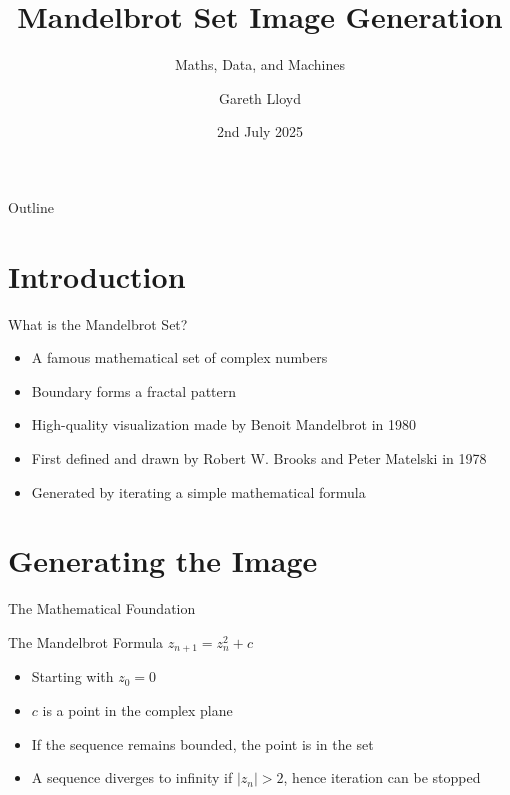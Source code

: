 \documentclass{beamer}
\title{Mandelbrot Set Image Generation}
\subtitle{Maths, Data, and Machines}
\author{Gareth Lloyd}
\institute{ACCU York}
\date{2nd July 2025}
\begin{document}
\begin{frame}
    \titlepage
\end{frame}

\begin{frame}{Outline}
    \tableofcontents
\end{frame}

\section{Introduction}
\begin{frame}{What is the Mandelbrot Set?}
    \begin{itemize}
        \item A famous mathematical set of complex numbers
        \item Boundary forms a fractal pattern
        \item High-quality visualization made by Benoit Mandelbrot in 1980
        \item First defined and drawn by Robert W. Brooks and Peter Matelski in 1978
        \item Generated by iterating a simple mathematical formula
    \end{itemize}
\end{frame}

\section{Generating the Image}
\begin{frame}{The Mathematical Foundation}

    \begin{block}{The Mandelbrot Formula}
        $z_{n+1} = z_n^2 + c$
    \end{block}
    \begin{itemize}
        \item Starting with $z_0 = 0$
        \item $c$ is a point in the complex plane
        \item If the sequence remains bounded, the point is in the set
        \item A sequence diverges to infinity if $|z_n| > 2$, hence iteration can be stopped
    \end{itemize}
\end{frame}
\end{document}
